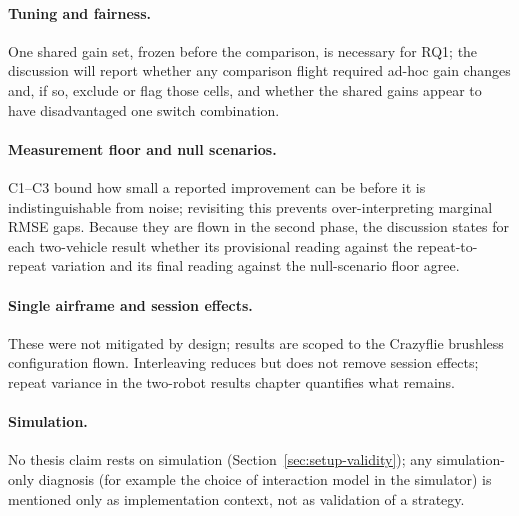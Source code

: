 \paragraph{Tuning and fairness.} One shared gain set, frozen before the comparison, is necessary for
RQ1; the discussion will report whether any comparison flight required ad-hoc gain changes and, if
so, exclude or flag those cells, and whether the shared gains appear to have disadvantaged one
switch combination.

\paragraph{Measurement floor and null scenarios.} C1--C3 bound how small a reported improvement can
be before it is indistinguishable from noise; revisiting this prevents over-interpreting marginal
RMSE gaps. Because they are flown in the second phase, the discussion states for each two-vehicle
result whether its provisional reading against the repeat-to-repeat variation and its final reading
against the null-scenario floor agree.

\paragraph{Single airframe and session effects.} These were not mitigated by design; results are
scoped to the Crazyflie brushless configuration flown. Interleaving reduces but does not remove
session effects; repeat variance in the two-robot results chapter quantifies what remains.

\paragraph{Simulation.} No thesis claim rests on simulation (Section~\ref{sec:setup-validity});
any simulation-only diagnosis (for example the choice of interaction model in the simulator) is
mentioned only as implementation context, not as validation of a strategy.


